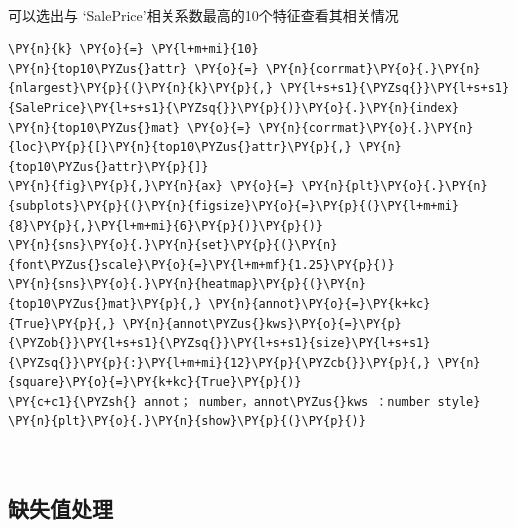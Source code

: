 \documentclass[no-math]{YangThesis}
\begin{document}
\begin{center}
\end{center}
{ \hspace*{\fill} \\}

可以选出与 `SalePrice'相关系数最高的10个特征查看其相关情况

\begin{tcolorbox}[breakable, size=fbox, boxrule=1pt, pad at break*=1mm,colback=cellbackground, colframe=cellborder]
	\begin{Verbatim}[commandchars=\\\{\}]
\PY{n}{k} \PY{o}{=} \PY{l+m+mi}{10}
\PY{n}{top10\PYZus{}attr} \PY{o}{=} \PY{n}{corrmat}\PY{o}{.}\PY{n}{nlargest}\PY{p}{(}\PY{n}{k}\PY{p}{,} \PY{l+s+s1}{\PYZsq{}}\PY{l+s+s1}{SalePrice}\PY{l+s+s1}{\PYZsq{}}\PY{p}{)}\PY{o}{.}\PY{n}{index}
\PY{n}{top10\PYZus{}mat} \PY{o}{=} \PY{n}{corrmat}\PY{o}{.}\PY{n}{loc}\PY{p}{[}\PY{n}{top10\PYZus{}attr}\PY{p}{,} \PY{n}{top10\PYZus{}attr}\PY{p}{]}
\PY{n}{fig}\PY{p}{,}\PY{n}{ax} \PY{o}{=} \PY{n}{plt}\PY{o}{.}\PY{n}{subplots}\PY{p}{(}\PY{n}{figsize}\PY{o}{=}\PY{p}{(}\PY{l+m+mi}{8}\PY{p}{,}\PY{l+m+mi}{6}\PY{p}{)}\PY{p}{)}
\PY{n}{sns}\PY{o}{.}\PY{n}{set}\PY{p}{(}\PY{n}{font\PYZus{}scale}\PY{o}{=}\PY{l+m+mf}{1.25}\PY{p}{)}
\PY{n}{sns}\PY{o}{.}\PY{n}{heatmap}\PY{p}{(}\PY{n}{top10\PYZus{}mat}\PY{p}{,} \PY{n}{annot}\PY{o}{=}\PY{k+kc}{True}\PY{p}{,} \PY{n}{annot\PYZus{}kws}\PY{o}{=}\PY{p}{\PYZob{}}\PY{l+s+s1}{\PYZsq{}}\PY{l+s+s1}{size}\PY{l+s+s1}{\PYZsq{}}\PY{p}{:}\PY{l+m+mi}{12}\PY{p}{\PYZcb{}}\PY{p}{,} \PY{n}{square}\PY{o}{=}\PY{k+kc}{True}\PY{p}{)}
\PY{c+c1}{\PYZsh{} annot； number，annot\PYZus{}kws ：number style}
\PY{n}{plt}\PY{o}{.}\PY{n}{show}\PY{p}{(}\PY{p}{)}
	\end{Verbatim}
\end{tcolorbox}

\begin{center}
\end{center}
{ \hspace*{\fill} \\}

\hypertarget{ux7f3aux5931ux503cux5904ux7406}{%
	\subsection{缺失值处理}\label{ux7f3aux5931ux503cux5904ux7406}}
\end{document}
